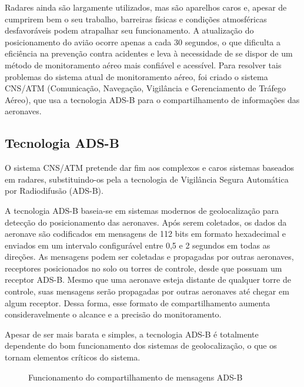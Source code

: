 Radares ainda são largamente utilizados, mas são aparelhos caros e, apesar de cumprirem bem o seu trabalho, barreiras físicas e condições atmosféricas desfavoráveis podem atrapalhar seu funcionamento. A atualização do posicionamento do avião ocorre apenas a cada 30 segundos, o que dificulta a eficiência na prevenção contra acidentes e leva à necessidade de se dispor de um método de monitoramento aéreo mais confiável e acessível. Para resolver tais problemas do sistema atual de monitoramento aéreo, foi criado o sistema CNS/ATM (Comunicação, Navegação, Vigilância e Gerenciamento de Tráfego Aéreo), que usa a tecnologia ADS-B para o compartilhamento de informações das aeronaves.

\subsection{Tecnologia ADS-B}

O sistema CNS/ATM pretende dar fim aos complexos e caros sistemas baseados em radares, substituindo-os pela a tecnologia de Vigilância Segura Automática por Radiodifusão (ADS-B).

A tecnologia ADS-B baseia-se em sistemas modernos de geolocalização para detecção do posicionamento das aeronaves. Após serem coletados, os dados da aeronave são codificados em mensagens de 112 bits em formato hexadecimal e enviados em um intervalo configurável entre 0,5 e 2 segundos em todas as direções. As mensagens podem ser coletadas e propagadas por outras aeronaves, receptores posicionados no solo ou torres de controle, desde que possuam um receptor ADS-B. Mesmo que uma aeronave esteja distante de qualquer torre de controle, suas mensagens serão propagadas por outras aeronaves até chegar em algum receptor. Dessa forma, esse formato de compartilhamento aumenta consideravelmente o alcance e a precisão do monitoramento.

Apesar de ser mais barata e simples, a tecnologia ADS-B é totalmente dependente do bom funcionamento dos sistemas de geolocalização, o que os tornam elementos críticos do sistema.

\begin{figure}[H] %

\caption{\label{fig:exemplo-1} Funcionamento do compartilhamento de mensagens ADS-B}

    
    	
\end{figure}

